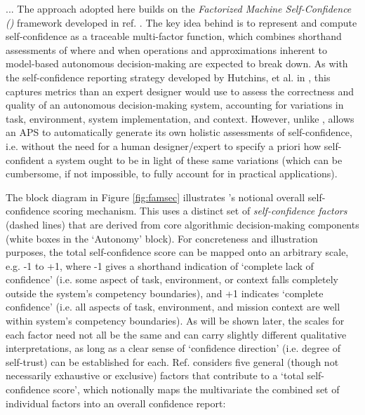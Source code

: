     ... The approach adopted here builds on the \emph{Factorized Machine Self-Confidence (\famsec)} framework developed in ref. \cite{Aitken2016-cv, Aitken2016-fb}. The key idea behind \famsec is to represent and compute self-confidence as a traceable multi-factor function, which combines shorthand assessments of where and when operations and approximations inherent to model-based autonomous decision-making are expected to break down. As with the self-confidence reporting strategy developed by Hutchins, et al. in \cite{Hutchins2015-if}, this captures metrics than an expert designer would use to assess the correctness and quality of an autonomous decision-making system, accounting for variations in task, environment, system implementation, and context. However, unlike \cite{Hutchins2015-if}, \famsec allows an APS to automatically generate its own holistic assessments of self-confidence, i.e. without the need for a human designer/expert to specify a priori how self-confident a system ought to be in light of these same variations (which can be cumbersome, if not impossible, to fully account for in practical applications). 
    
    The block diagram in Figure \ref{fig:famsec} illustrates \famsec's notional overall self-confidence scoring mechanism. This uses a distinct set of \emph{self-confidence factors} (dashed lines) that are derived from core algorithmic decision-making components (white boxes in the `Autonomy' block). For concreteness and illustration purposes, the total self-confidence score can be mapped onto an arbitrary scale, e.g. -1 to +1, where -1 gives a shorthand indication of `complete lack of confidence' (i.e. some aspect of task, environment, or context falls completely outside the system's competency boundaries), and +1 indicates `complete confidence' (i.e. all aspects of task, environment, and mission context are well within system's competency boundaries). As will be shown later, the scales for each factor need not all be the same and can carry slightly different qualitative interpretations, as long as a clear sense of `confidence direction' (i.e. degree of self-trust) can be established for each. Ref. \cite{Aitken2016-cv} considers five general (though not necessarily exhaustive or exclusive) factors that contribute to a `total self-confidence score', which notionally maps the multivariate the combined set of individual factors into an overall confidence report:
    

